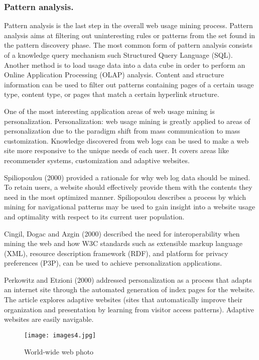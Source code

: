 \documentclass{article}
\begin{document}
\subsubsection{ Pattern analysis.}
Pattern analysis is the last step in the overall web usage mining process. Pattern analysis aims at filtering out uninteresting rules or patterns from the set found in the pattern discovery phase. The most common form of pattern analysis consists of a knowledge query mechanism such Structured Query Language (SQL). Another method is to load usage data into a data cube in order to perform an Online Application Processing (OLAP) analysis. Content and structure information can be used to filter out patterns containing pages of a certain usage type, content type, or pages that match a certain hyperlink structure.

One of the most interesting application areas of web usage mining is personalization.
Personalization: web usage mining is greatly applied to areas of personalization due to the paradigm shift from mass communication to mass customization. Knowledge discovered from web logs can be used to make a web site more responsive to the unique needs of each user. It covers areas like recommender systems, customization and adaptive websites.
 
Spiliopoulou (2000) provided a rationale for why web log data should be mined. To retain users, a website should effectively provide them with the contents they need in the most optimized manner. Spiliopoulou describes a process by which mining for navigational patterns may be used to gain insight into a website usage and optimality with respect to its current user population.

Cingil, Dogac and Azgin (2000) described the need for interoperability when mining the web and how W3C standards such as extensible markup language (XML), resource description framework (RDF), and platform for privacy preferences (P3P), can be used to achieve personalization applications.

 Perkowitz and Etzioni (2000) addressed personalization as a process that adapts an internet site through the automated generation of index pages for the website. The article explores adaptive websites (sites that automatically improve their organization and presentation by learning from visitor access patterns). Adaptive websites are easily navigable.
\newline
\newline
\newline
\begin{figure}
\centering
\texttt{[image: images4.jpg]}
\caption{World-wide web photo}
\end{figure}
 
\end{document}
